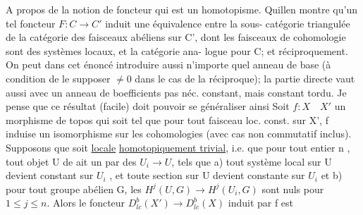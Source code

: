 A propos de la notion de foncteur qui est un homotopisme. Quillen
 montre qu'un tel foncteur $F\colon C \to C'$ induit une équivalence entre la sous-
catégorie triangulée  de la catégorie  des faisceaux abéliens sur C', dont
les faisceaux de cohomologie sont des systèmes locaux, et la catégorie ana-
logue pour C;  et réciproquement.  On peut
dans cet énoncé introduire aussi n'importe quel anneau de base (à condition
de le supposer $\neq 0$ dans le cas de la réciproque);  la partie directe
vaut aussi avec un anneau de boefficients pas néc. constant, mais constant
tordu. Je pense que ce résultat (facile) doit pouvoir se généraliser ainsi
Soit $f\colon X \quad X'$ un morphisme de topos qui soit tel que pour tout 
faisceau loc. const. sur X', f induise un isomorphisme sur les cohomologies
(avec cas non commutatif inclus). Supposons que   soit \uline{locale}
  \uline{homotopiquement trivial}, i.e. que  pour tout entier n , tout objet U de
 ait un   par des $U_i \to U$, tels que a) tout système local sur U
devient constant sur $U_i$ , et toute section sur U devient constante sur $U_i$
et b) pour tout  groupe abélien G, les $H^j(U,G) \longrightarrow H^j(U_i,G)$ sont
nuls pour $1 \leq j \leq n$. Alors le foncteur $D^b_{lc}(X') \longrightarrow D^b_{lc}(X)$ induit par f est

\margin{\o{}} 

